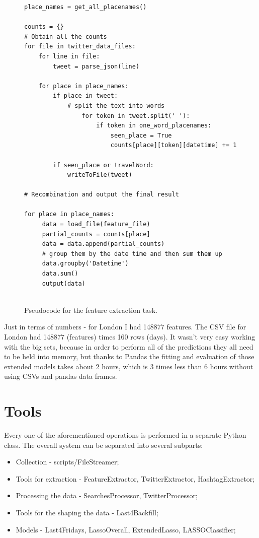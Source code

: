 \documentclass[minf,twoside,singlespacing,parskip,frontabs,notimes,11pt]{infthesis}
\begin{document}
\begin{figure}[p]
\begin{center}
\begin{lstlisting}
place_names = get_all_placenames()

counts = {}
# Obtain all the counts
for file in twitter_data_files:
    for line in file:
        tweet = parse_json(line)
  
  	for place in place_names:
	    if place in tweet:
	        # split the text into words
                for token in tweet.split(' '): 
                    if token in one_word_placenames:
                        seen_place = True
                        counts[place][token][datetime] += 1

        if seen_place or travelWord:
            writeToFile(tweet)
            
# Recombination and output the final result

for place in place_names:
     data = load_file(feature_file)
     partial_counts = counts[place]
     data = data.append(partial_counts)
     # group them by the date time and then sum them up
     data.groupby('Datetime')
     data.sum()
     output(data)
    
\end{lstlisting}
\end{center}
\caption{Pseudocode for the feature extraction task.}
\end{figure}


Just in terms of numbers - for London I had 148877 features. The CSV file for London had 148877 (features) times 160 rows (days). It wasn't very easy working with the big sets, because in order to perform all of the predictions they all need to be held into memory, but thanks to Pandas \cite{pandas} the fitting and evaluation of those extended models takes about 2 hours, which is 3 times less than 6 hours without using CSVs and pandas data frames.

\newpage
\section{Tools}


Every one of the aforementioned operations is performed in a separate Python class. The overall system can be separated into several subparts:
\begin{itemize}
\item Collection - scripts/FileStreamer; 
\item Tools for extraction - FeatureExtractor, TwitterExtractor, HashtagExtractor;
\item Processing the data - SearchesProcessor, TwitterProcessor;
\item Tools for the shaping the data - Last4Backfill;
\item Models - Last4Fridays, LassoOverall, ExtendedLasso, LASSOClassifier;
\end{itemize}
\end{document}
